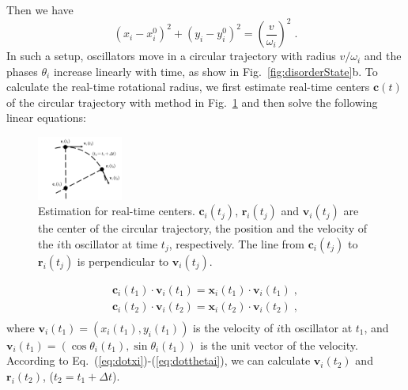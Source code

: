 \documentclass[%
 aip,
 amsmath,amssymb,
 reprint,%
]{revtex4-1}
\begin{document}
Then we have
\begin{equation}
    \left( x_i -x_{i}^{0} \right) ^2+\left( y_i -y_{i}^{0} \right) ^2=\left( \frac{v}{\omega _i} \right) ^2\;.
\end{equation}
In such a setup, oscillators move in a circular trajectory with radius $v/\omega _i$ and the phases $\theta_i$ increase linearly with time, as show in Fig.~\ref{fig:disorderState}b. To calculate the real-time rotational radius, we first estimate real-time centers $\mathbf{c}(t)$ of the circular trajectory with method in Fig.~\ref{fig:CenterEps} and then solve the following linear equations:

\begin{figure}[b]
    \includegraphics[width=0.25\textwidth]{./figs/CenterEps.pdf}
    \caption{\label{fig:CenterEps} Estimation for real-time centers.
    $\mathbf{c}_i(t_j)$, $\mathbf{r}_i(t_j)$ and $\mathbf{v}_i(t_j)$ are the center of the circular trajectory, the position and the velocity of the $i$th oscillator at time $t_j$, respectively.
    The line from $\mathbf{c}_i(t_j)$ to $\mathbf{r}_i(t_j)$ is perpendicular to $\mathbf{v}_i(t_j)$.}
\end{figure}

\begin{equation}\label{eq:linearEquations}
    \begin{array}{c}
        \mathbf{c}_i\left( t_1 \right) \cdot \mathbf{v}_i\left( t_1 \right) =\mathbf{x}_i\left( t_1 \right) \cdot \mathbf{v}_i\left( t_1 \right)\;,\\
        \mathbf{c}_i\left( t_2 \right) \cdot \mathbf{v}_i\left( t_2 \right) =\mathbf{x}_i\left( t_2 \right) \cdot \mathbf{v}_i\left( t_2 \right)\;,\\
    \end{array}
\end{equation}
where $\mathbf{v}_i(t_1)=\left( x_i\left( t_1 \right) , y_i\left( t_1 \right) \right)$ is the velocity of $i$th oscillator at $t_1$, and $\mathbf{v}_i(t_1)=\left( \cos \theta _i\left( t_1 \right) , \sin \theta _i\left( t_1 \right) \right)$ is the unit vector of the velocity. According to Eq.~(\ref{eq:dotxi})-(\ref{eq:dotthetai}), we can calculate $\mathbf{v}_i(t_2)$ and $\mathbf{r}_i(t_2)$, ($t_2=t_1+\Delta t$). 
 
\end{document}
